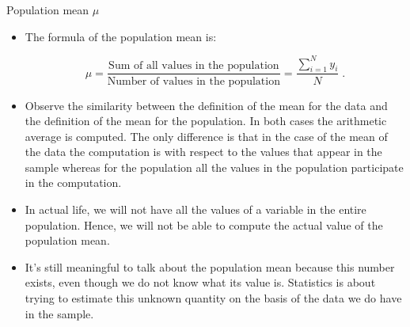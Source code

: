 \documentclass[10pt]{beamer}\usepackage[]{graphicx}\usepackage[]{color}
\begin{document}
\begin{frame}{Population mean $\mu$}
	
	\begin{itemize}[<+->]
		
		\item The formula of the population mean is:
		
		$$\mu = \frac{\mbox{Sum of all values in the population}}{\mbox{Number of values in the population}}= \frac{\sum_{i=1}^N y_i}{N}\;.$$
		
		
		\item Observe the similarity between the definition of the mean for the data
		and the definition of the mean for the population. In both cases the
		arithmetic average is computed. The only difference is that in the case
		of the mean of the data the computation is with respect to the values
		that appear in the sample whereas for the population all the values in
		the population participate in the computation.
		
		\item In actual life, we will not have all the values of a variable in the
		entire population. Hence, we will not be able to compute the actual
		value of the population mean. 
		
		\item It's still meaningful to talk about the population mean because this number exists, even though we do
		not know what its value is. Statistics is about trying to estimate this unknown quantity on the basis of the data we do have in the sample.
		
	\end{itemize}
	
\end{frame}
\end{document}
